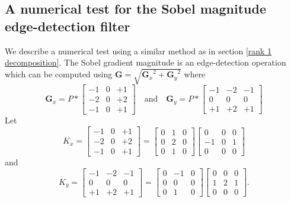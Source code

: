 \documentclass[12pt]{amsart}
\theoremstyle{definition}
\theoremstyle{remark}
\numberwithin{thm}{section}
\newcommand{\LUT}{\text{LUT}}
\begin{document}
\subsection{A numerical test for the Sobel magnitude edge-detection filter}\label{subsubsection:sobel}
We describe a numerical test using a similar method as in section \ref{rank 1 decomposition}. 
The Sobel gradient magnitude is an edge-detection operation \cite{Sob68} which can be computed using
$\mathbf{G} = \sqrt{ {\mathbf{G}_x}^2 + {\mathbf{G}_y}^2 }$
where
$$\mathbf{G}_x = P*\begin{bmatrix} 
 -1 & 0 & +1  \\
-2 & 0 & +2 \\
-1 & 0 & +1 
\end{bmatrix} 
\quad
\mbox{and}
\quad   
\mathbf{G}_y = P*\begin{bmatrix} 
-1 & -2 & -1 \\
 0 & 0 & 0 \\
+1 & +2 & +1
\end{bmatrix}$$
Let $$K_x=\begin{bmatrix} 
 -1 & 0 & +1  \\
-2 & 0 & +2 \\
-1 & 0 & +1 
\end{bmatrix}=
\begin{bmatrix}0 &1 &0\\0 &2 &0 \\0 &1 &0
\end{bmatrix}
\begin{bmatrix}0 &0 &0\\-1 & 0 & 1\\ 0 & 0 &0\end{bmatrix}$$ and
$$K_y=\begin{bmatrix} 
 -1 & -2 & -1  \\
0 & 0 & 0 \\
+1 & +2 & +1 
\end{bmatrix}=
\begin{bmatrix}0 &-1 &0\\0 &0 &0\\0 &1 &0
\end{bmatrix}
\begin{bmatrix}0 & 0 & 0\\ 1 & 2 & 1 \\ 0 &0 &0\end{bmatrix}.$$


\end{document}

